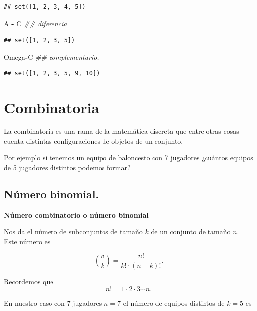 \documentclass[]{book}
\newenvironment{Shaded}{\begin{snugshade}}{\end{snugshade}}
\newcommand{\CommentTok}[1]{\textcolor[rgb]{0.56,0.35,0.01}{\textit{#1}}}
\newcommand{\NormalTok}[1]{#1}
\newcommand{\OperatorTok}[1]{\textcolor[rgb]{0.81,0.36,0.00}{\textbf{#1}}}
\begin{document}
\begin{verbatim}
## set([1, 2, 3, 4, 5])
\end{verbatim}

\begin{Shaded}
\begin{Highlighting}[]
\NormalTok{A }\OperatorTok{-}\NormalTok{ C   }\CommentTok{## diferencia }
\end{Highlighting}
\end{Shaded}

\begin{verbatim}
## set([1, 2, 3, 5])
\end{verbatim}

\begin{Shaded}
\begin{Highlighting}[]
\NormalTok{Omega}\OperatorTok{-}\NormalTok{C }\CommentTok{## complementario.}
\end{Highlighting}
\end{Shaded}

\begin{verbatim}
## set([1, 2, 3, 5, 9, 10])
\end{verbatim}

\hypertarget{combinatoria}{%
\section{Combinatoria}\label{combinatoria}}

La combinatoria es una rama de la matemática discreta que entre otras cosas cuenta distintas configuraciones de objetos de un conjunto.

Por ejemplo si tenemos un equipo de baloncesto con 7 jugadores ¿cuántos equipos de 5 jugadores distintos podemos formar?

\hypertarget{nuxfamero-binomial.}{%
\subsection{Número binomial.}\label{nuxfamero-binomial.}}

\textbf{Número combinatorio o número binomial}

Nos da el número de subconjuntos de tamaño \(k\) de un conjunto de tamaño \(n\). Este número es

\[
{n\choose k} = \frac{n!}{k!\cdot (n-k)!}.
\]

Recordemos que
\[
n!=1\cdot 2\cdot 3\cdots n.
\]

En nuestro caso con 7 jugadores \(n=7\) el número de equipos distintos de \(k=5\) es
\end{document}
